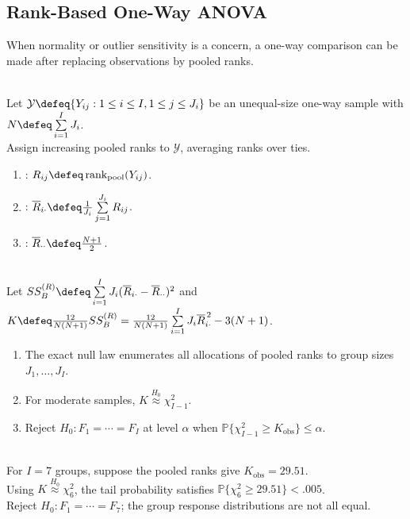 \subsection{Rank-Based One-Way ANOVA}

When normality or outlier sensitivity is a concern, a one-way comparison can be made after replacing observations by pooled ranks.

\begin{definition} \label{def:kruskal-wallis-ranks} \\
Let $\mathcal{Y}\defeq\{Y_{ij}:1\leq i\leq I, 1\leq j\leq J_i\}$ be an unequal-size one-way sample with $N\defeq\sum\limits_{i=1}^{I}J_i$.\\
Assign increasing pooled ranks to $\mathcal{Y}$, averaging ranks over ties.
\begin{enumerate}[label=(\roman*)]
\setlength{\itemsep}{0pt}
\item {}: $R_{ij}\defeq \operatorname{rank}_{\mathrm{pool}}(Y_{ij})$.
\item {}: $\overline{R}_{i\cdot}\defeq \frac1{J_i}\sum\limits_{j=1}^{J_i}R_{ij}$.
\item {}: $\overline{R}_{\cdot\cdot}\defeq \frac{N+1}{2}$.
\end{enumerate}
\end{definition}

\begin{method} \label{meth:kruskal-wallis-test} \\
Let $SS_B^{(R)}\defeq \sum\limits_{i=1}^{I}J_i(\overline{R}_{i\cdot}-\overline{R}_{\cdot\cdot})^2$ and $K\defeq \frac{12}{N(N+1)}SS_B^{(R)}=\frac{12}{N(N+1)}\sum\limits_{i=1}^{I}J_i\overline{R}_{i\cdot}^{\,2}-3(N+1)$.
\begin{enumerate}[label=(\roman*)]
\setlength{\itemsep}{0pt}
\item The exact null law enumerates all allocations of pooled ranks to group sizes $J_1,\ldots,J_I$.
\item For moderate samples, $K\overset{H_0}{\approx}\chi^2_{I-1}$.
\item Reject $H_0:F_1=\cdots=F_I$ at level $\alpha$ when $\mathbb{P}\{\chi^2_{I-1}\geq K_{\mathrm{obs}}\}\leq\alpha$.
\end{enumerate}
\end{method}

\begin{example} \label{ex:kruskal-wallis-rank-calculation} \\
For $I=7$ groups, suppose the pooled ranks give $K_{\mathrm{obs}}=29.51$.\\
Using $K\overset{H_0}{\approx}\chi^2_6$, the tail probability satisfies $\mathbb{P}\{\chi^2_6\geq29.51\}<.005$.\\
Reject $H_0:F_1=\cdots=F_7$; the group response distributions are not all equal.
\end{example}

